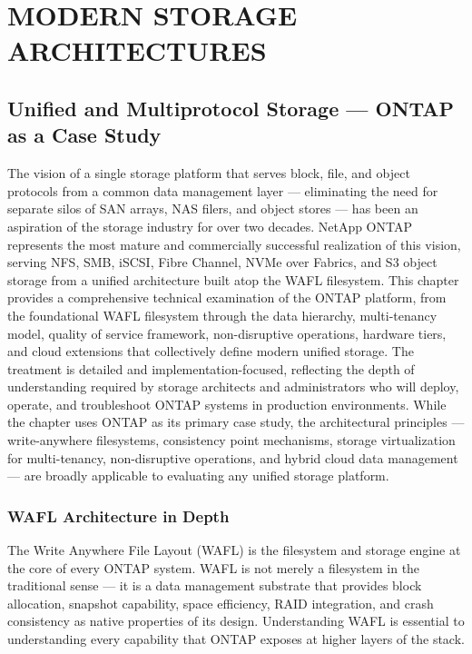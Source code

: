\part{MODERN STORAGE ARCHITECTURES}

\chapter{Unified and Multiprotocol Storage --- ONTAP as a Case Study}
\label{ch:14}

The vision of a single storage platform that serves block, file, and object protocols from a common data management layer --- eliminating the need for separate silos of SAN arrays, NAS filers, and object stores --- has been an aspiration of the storage industry for over two decades. NetApp ONTAP represents the most mature and commercially successful realization of this vision, serving NFS, SMB, iSCSI, Fibre Channel, NVMe over Fabrics, and S3 object storage from a unified architecture built atop the WAFL filesystem. This chapter provides a comprehensive technical examination of the ONTAP platform, from the foundational WAFL filesystem through the data hierarchy, multi-tenancy model, quality of service framework, non-disruptive operations, hardware tiers, and cloud extensions that collectively define modern unified storage. The treatment is detailed and implementation-focused, reflecting the depth of understanding required by storage architects and administrators who will deploy, operate, and troubleshoot ONTAP systems in production environments. While the chapter uses ONTAP as its primary case study, the architectural principles --- write-anywhere filesystems, consistency point mechanisms, storage virtualization for multi-tenancy, non-disruptive operations, and hybrid cloud data management --- are broadly applicable to evaluating any unified storage platform.

\section{WAFL Architecture in Depth}

The Write Anywhere File Layout (WAFL) is the filesystem and storage engine at the core of every ONTAP system. WAFL is not merely a filesystem in the traditional sense --- it is a data management substrate that provides block allocation, snapshot capability, space efficiency, RAID integration, and crash consistency as native properties of its design. Understanding WAFL is essential to understanding every capability that ONTAP exposes at higher layers of the stack.

